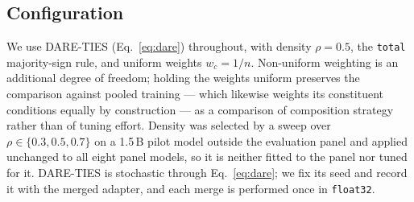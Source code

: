 \subsection{Configuration}
We use \textsc{DARE-TIES} (Eq.~\ref{eq:dare}) throughout, with density $\rho = 0.5$, the \texttt{total} majority-sign rule, and
uniform weights $w_c = 1/n$. Non-uniform weighting is an additional degree of freedom; holding the
weights uniform preserves the comparison against pooled training --- which likewise weights its
constituent conditions equally by construction --- as a comparison of composition strategy rather
than of tuning effort. Density was selected by a sweep over $\rho \in \{0.3, 0.5, 0.7\}$ on a
1.5\,B pilot model outside the evaluation panel and applied unchanged to all eight panel models, so
it is neither fitted to the panel nor tuned for it. \textsc{DARE-TIES} is stochastic through
Eq.~\ref{eq:dare}; we fix its seed and record it with the merged adapter, and each merge is performed
once in \texttt{float32}.

